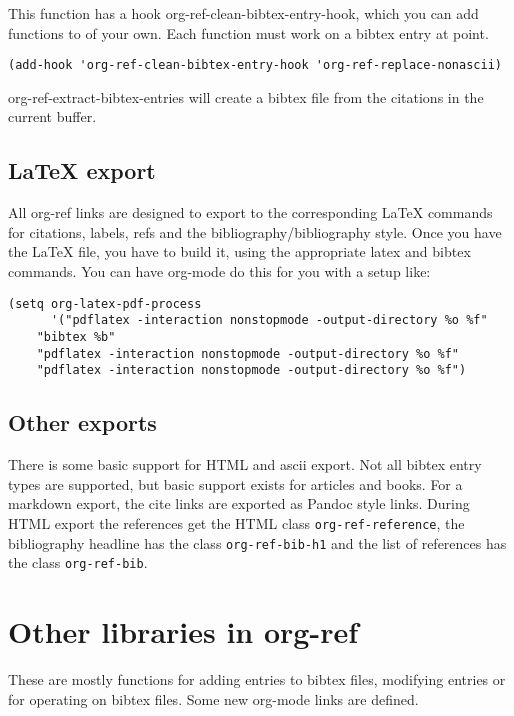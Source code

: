 \documentclass[11pt]{article}
\begin{document}
This function has a hook org-ref-clean-bibtex-entry-hook, which you can add functions to of your own. Each function must work on a bibtex entry at point.

\begin{verbatim}
(add-hook 'org-ref-clean-bibtex-entry-hook 'org-ref-replace-nonascii)
\end{verbatim}


org-ref-extract-bibtex-entries will create a bibtex file from the citations in the current buffer.

\subsection{\LaTeX{} export}
\label{sec:orgheadline11}

All org-ref links are designed to export to the corresponding \LaTeX{} commands for citations, labels, refs and the bibliography/bibliography style. Once you have the \LaTeX{} file, you have to build it, using the appropriate latex and bibtex commands. You can have org-mode do this for you with a setup like:

\begin{verbatim}
(setq org-latex-pdf-process
      '("pdflatex -interaction nonstopmode -output-directory %o %f"
	"bibtex %b"
	"pdflatex -interaction nonstopmode -output-directory %o %f"
	"pdflatex -interaction nonstopmode -output-directory %o %f")
\end{verbatim}

\subsection{Other exports}
\label{sec:orgheadline12}
 
There is some basic support for HTML and ascii export. Not all bibtex entry types are supported, but basic support exists for articles and books. For a markdown export, the cite links are exported as Pandoc style links. During HTML export the references get the HTML class \texttt{org-ref-reference}, the bibliography headline has the class \texttt{org-ref-bib-h1} and the list of references has the class \texttt{org-ref-bib}.
\section{Other libraries in org-ref}
\label{sec:orgheadline30}
These are mostly functions for adding entries to bibtex files, modifying entries or for operating on bibtex files. Some new org-mode links are defined.
\end{document}
